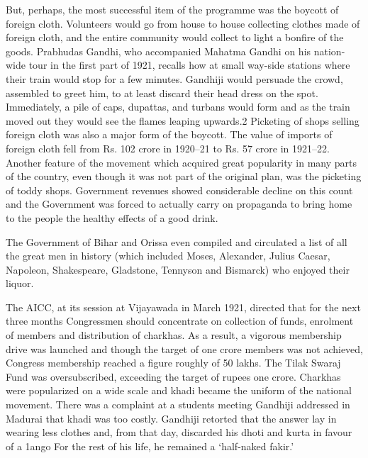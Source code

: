 \begin{multicols}{2}
But, perhaps, the most successful item of the programme was the boycott of foreign cloth. Volunteers would go from house to house collecting clothes made of foreign cloth, and the entire community would collect to light a bonfire of the goods. Prabhudas Gandhi, who accompanied Mahatma Gandhi on his nation-wide tour in the first part of 1921, recalls how at small way-side stations where their train would stop for a few minutes. Gandhiji would persuade the crowd, assembled to greet him, to at least discard their head dress on the spot. Immediately, a pile of caps, dupattas, and turbans would form and as the train moved out they would see the flames leaping upwards.2 Picketing of shops selling foreign cloth was also a major form of the boycott. The value of imports of foreign cloth fell from Rs. 102 crore in 1920--21 to Rs. 57 crore in 1921--22. Another feature of the movement which acquired great popularity in many parts of the country, even though it was not part of the original plan, was the picketing of toddy shops. Government revenues showed considerable decline on this count and the Government was forced to actually carry on propaganda to bring home to the people the healthy effects of a good drink. 

The Government of Bihar and Orissa even compiled and circulated a list of all the great men in history (which included Moses, Alexander, Julius Caesar, Napoleon, Shakespeare, Gladstone, Tennyson and Bismarck) who enjoyed their liquor. 

The AICC, at its session at Vijayawada in March 1921, directed that for the next three months Congressmen should concentrate on collection of funds, enrolment of members and distribution of charkhas. As a result, a vigorous membership drive was launched and though the target of one crore members was not achieved, Congress membership reached a figure roughly of 50 lakhs. The Tilak Swaraj Fund was oversubscribed, exceeding the target of rupees one crore. Charkhas were popularized on a wide scale and khadi became the uniform of the national movement. There was a complaint at a students meeting Gandhiji addressed in Madurai that khadi was too costly. Gandhiji retorted that the answer lay in wearing less clothes and, from that day, discarded his dhoti and kurta in favour of a 1ango For the rest of his life, he remained a `half-naked fakir.' 


\end{multicols}
